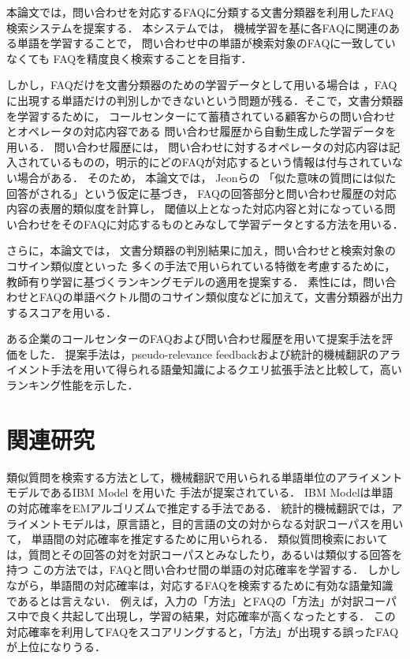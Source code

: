 \documentclass[japanese]{jnlp_1.4}
\begin{document}
本論文では，問い合わせを対応するFAQに分類する文書分類器を利用したFAQ検索システムを提案する．
本システムでは，
機械学習を基に各FAQに関連のある単語を学習することで，
問い合わせ中の単語が検索対象のFAQに一致していなくても
FAQを精度良く検索することを目指す．

しかし，FAQだけを文書分類器のための学習データとして用いる場合は
，FAQに出現する単語だけの判別しかできないという問題が残る．そこで，文書分類器を学習するために，
コールセンターにて蓄積されている顧客からの問い合わせとオペレータの対応内容である
問い合わせ履歴から自動生成した学習データを用いる．
問い合わせ履歴には，
問い合わせに対するオペレータの対応内容は記入されているものの，明示的にどのFAQが対応するという情報は付与されていない場合がある．
そのため，
本論文では，
Jeonらの\cite{jeon:05}
「似た意味の質問には似た回答がされる」という仮定に基づき，
FAQの回答部分と問い合わせ履歴の対応内容の表層的類似度を計算し，
閾値以上となった対応内容と対になっている問い合わせをそのFAQに対応するものとみなして学習データとする方法を用いる．

さらに，本論文では，  文書分類器の判別結果に加え，問い合わせと検索対象のコサイン類似度といった
多くの手法で用いられている特徴を考慮するために，教師有り学習に基づくランキングモデルの適用を提案する．
素性には，問い合わせとFAQの単語ベクトル間のコサイン類似度などに加えて，文書分類器が出力するスコアを用いる．

ある企業のコールセンターのFAQおよび問い合わせ履歴を用いて提案手法を評価をした．
提案手法は，pseudo-relevance feedbackおよび統計的機械翻訳のアライメント手法を用いて得られる語彙知識によるクエリ拡張手法と比較して，高いランキング性能を示した．


\section{関連研究}

類似質問を検索する方法として，機械翻訳で用いられる単語単位のアライメントモデルであるIBM Model \cite{brown:93} を用いた
手法が提案されている\cite{jeon:05,riezler:07,soricut:04,xue:08}．
IBM Modelは単語の対応確率をEMアルゴリズムで推定する手法である．
統計的機械翻訳では，アライメントモデルは，原言語と，目的言語の文の対からなる対訳コーパスを用いて，
単語間の対応確率を推定するために用いられる．
類似質問検索においては，質問とその回答の対を対訳コーパスとみなしたり，あるいは類似する回答を持つ
この方法では，FAQと問い合わせ間の単語の対応確率を学習する．
しかしながら，単語間の対応確率は，対応するFAQを検索するために有効な語彙知識であるとは言えない．
例えば，入力の「方法」とFAQの「方法」が対訳コーパス中で良く共起して出現し，学習の結果，対応確率が高くなったとする．
この対応確率を利用してFAQをスコアリングすると，「方法」が出現する誤ったFAQが上位になりうる．
\end{document}
